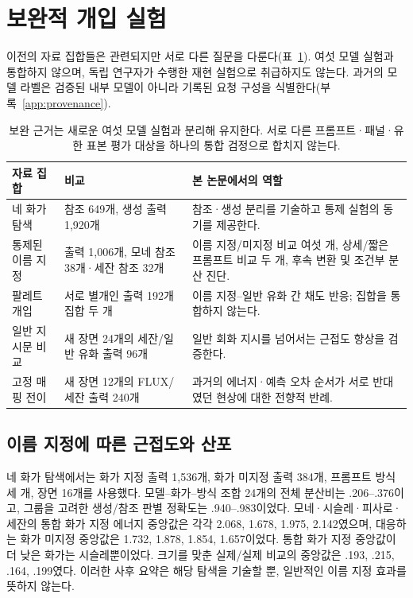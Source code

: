 \documentclass[11pt,a4paper]{article}
\begin{document}
\section{보완적 개입 실험}\label{app:cohorts}
이전의 자료 집합들은 관련되지만 서로 다른 질문을 다룬다(표~\ref{tab:cohorts}). 여섯 모델 실험과 통합하지 않으며, 독립 연구자가 수행한 재현 실험으로 취급하지도 않는다. 과거의 모델 라벨은 검증된 내부 모델이 아니라 기록된 요청 구성을 식별한다(부록~\ref{app:provenance}).

\begin{table}[H]
\centering\small
\begin{tabularx}{\linewidth}{@{}>{\raggedright\arraybackslash}p{.21\linewidth}>{\raggedright\arraybackslash}p{.30\linewidth}>{\raggedright\arraybackslash}X@{}}
\toprule
자료 집합 & 비교 & 본 논문에서의 역할\\\midrule
네 화가 탐색 & 참조 649개, 생성 출력 1,920개 & 참조·생성 분리를 기술하고 통제 실험의 동기를 제공한다.\\[5pt]
통제된 이름 지정 & 출력 1,006개, 모네 참조 38개·세잔 참조 32개 & 이름 지정/미지정 비교 여섯 개, 상세/짧은 프롬프트 비교 두 개, 후속 변환 및 조건부 분산 진단.\\[5pt]
팔레트 개입 & 서로 별개인 출력 192개 집합 두 개 & 이름 지정--일반 유화 간 채도 반응; 집합을 통합하지 않는다.\\[5pt]
일반 지시문 비교 & 새 장면 24개의 세잔/일반 유화 출력 96개 & 일반 회화 지시를 넘어서는 근접도 향상을 검증한다.\\[5pt]
고정 매핑 전이 & 새 장면 12개의 FLUX/세잔 출력 240개 & 과거의 에너지·예측 오차 순서가 서로 반대였던 현상에 대한 전향적 반례.\\
\bottomrule
\end{tabularx}
\caption{보완 근거는 새로운 여섯 모델 실험과 분리해 유지한다. 서로 다른 프롬프트·패널·유한 표본 평가 대상을 하나의 통합 검정으로 합치지 않는다.}
\label{tab:cohorts}
\end{table}

\subsection{이름 지정에 따른 근접도와 산포}
네 화가 탐색에서는 화가 지정 출력 1,536개, 화가 미지정 출력 384개, 프롬프트 방식 세 개, 장면 16개를 사용했다. 모델--화가--방식 조합 24개의 전체 분산비는 .206--.376이고, 그룹을 고려한 생성/참조 판별 정확도는 .940--.983이었다. 모네·시슬레·피사로·세잔의 통합 화가 지정 에너지 중앙값은 각각 2.068, 1.678, 1.975, 2.142였으며, 대응하는 화가 미지정 중앙값은 1.732, 1.878, 1.854, 1.657이었다. 통합 화가 지정 중앙값이 더 낮은 화가는 시슬레뿐이었다. 크기를 맞춘 실제/실제 비교의 중앙값은 .193, .215, .164, .199였다. 이러한 사후 요약은 해당 탐색을 기술할 뿐, 일반적인 이름 지정 효과를 뜻하지 않는다.
\end{document}
